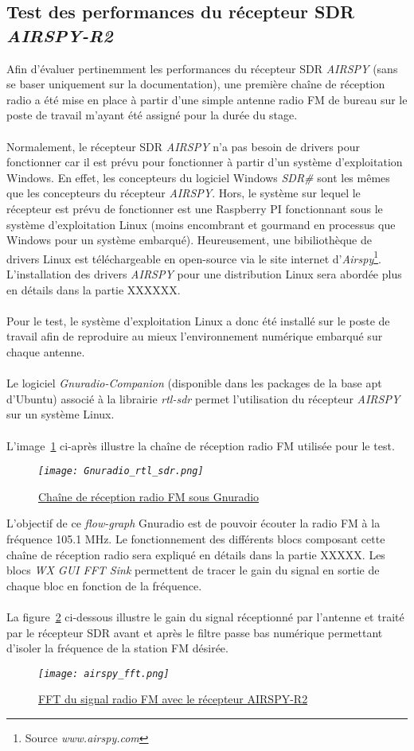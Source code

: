 \documentclass[12pt,fleqn]{book} %
\begin{document}
\subsection{Test des performances du récepteur SDR \emph{AIRSPY-R2}}
Afin d'évaluer pertinemment les performances du récepteur SDR \emph{AIRSPY} (sans se baser uniquement sur la documentation), une première chaîne de réception radio a été mise en place à partir d'une simple antenne radio FM de bureau sur le poste de travail m'ayant été assigné pour la durée du stage.
~\\\\Normalement, le récepteur SDR \emph{AIRSPY} n'a pas besoin de drivers pour fonctionner car il est prévu pour fonctionner à partir d'un système d'exploitation Windows. En effet, les concepteurs du logiciel Windows \emph{SDR\#} sont les mêmes que les concepteurs du récepteur \emph{AIRSPY}. Hors, le système sur lequel le récepteur est prévu de fonctionner est une Raspberry PI fonctionnant sous le système d'exploitation Linux (moins encombrant et gourmand en processus que Windows pour un système embarqué). Heureusement, une bibiliothèque de drivers Linux est téléchargeable en open-source via le site internet d'\emph{Airspy}\footnote{Source \emph{www.airspy.com}}. L'installation des drivers \emph{AIRSPY} pour une distribution Linux sera abordée plus en détails dans la partie XXXXXX.
~\\\\Pour le test, le système d'exploitation Linux a donc été installé sur le poste de travail afin de reproduire au mieux l'environnement numérique embarqué sur chaque antenne.
~\\\\Le logiciel \emph{Gnuradio-Companion} (disponible dans les packages de la base apt d'Ubuntu) associé à la librairie \emph{rtl-sdr} permet l'utilisation du récepteur \emph{AIRSPY} sur un système Linux. 
~\\\\L'image~\ref{gnu_airspy} ci-après illustre la chaîne de réception radio FM utilisée pour le test.
\begin{figure}[H]
	\centering
	\itshape
	\texttt{[image: Gnuradio\_rtl\_sdr.png]}
	\caption{\label{gnu_airspy} \underline{Chaîne de réception radio FM sous Gnuradio}}
\end{figure}
L'objectif de ce \emph{flow-graph} Gnuradio est de pouvoir écouter la radio FM à la fréquence 105.1 MHz. Le fonctionnement des différents blocs composant cette chaîne de réception radio sera expliqué en détails dans la partie XXXXX. Les blocs \emph{WX GUI FFT Sink} permettent de tracer le gain du signal en sortie de chaque bloc en fonction de la fréquence.
~\\\\La figure~\ref{airspy_fft} ci-dessous illustre le gain du signal réceptionné par l'antenne et traité par le récepteur SDR avant et après le filtre passe bas numérique permettant d'isoler la fréquence de la station FM désirée.
\begin{figure}[H]
	\centering
	\itshape
	\texttt{[image: airspy\_fft.png]}
	\caption{\label{airspy_fft} \underline{FFT du signal radio FM avec le récepteur AIRSPY-R2}}
\end{figure}
\end{document}
